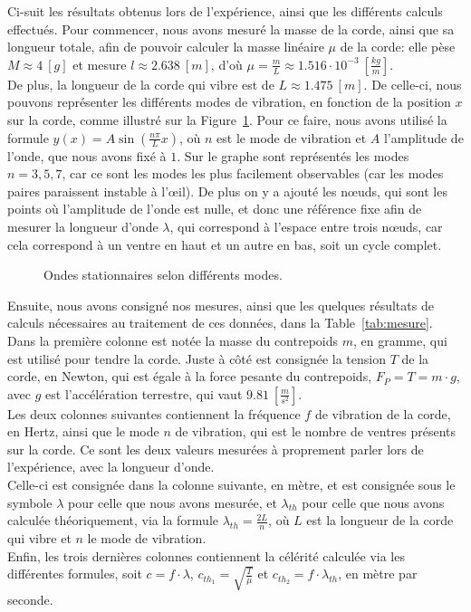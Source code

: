 \documentclass[11pt]{article}
\begin{document}
    Ci-suit les résultats obtenus lors de l'expérience, ainsi que les différents calculs effectués.
    Pour commencer, nous avons mesuré la masse de la corde, ainsi que sa longueur totale, afin de pouvoir calculer
    la masse linéaire $\mu$ de la corde: elle pèse $M \approx 4 \ [g]$ et mesure $l \approx 2.638 \ [m]$, d'où
    $\mu = \frac{m}{L} \approx 1.516 \cdot 10^{-3} \ \left[\frac{kg}{m}\right]$.\\
    De plus, la longueur de la corde qui vibre est de $L \approx 1.475 \ [m]$.
    De celle-ci, nous pouvons représenter les différents modes de vibration, en fonction de la position $x$ sur la
    corde, comme illustré sur la Figure~\ref{fig:waves}.
    Pour ce faire, nous avons utilisé la formule $y(x) = A \sin \left( \frac{n \pi}{L} x \right)$, où $n$ est le mode
    de vibration et $A$ l'amplitude de l'onde, que nous avons fixé à $1$.
    Sur le graphe sont représentés les modes $n=3,5,7$, car ce sont les modes les plus facilement observables (car
    les modes paires paraissent instable à l'œil).
    De plus on y a ajouté les nœuds, qui sont les points où l'amplitude de l'onde est nulle, et donc une référence
    fixe afin de mesurer la longueur d'onde $\lambda$, qui correspond à l'espace entre trois nœuds, car cela
    correspond à un ventre en haut et un autre en bas, soit un cycle complet.

    \begin{figure}[H]
        \centering
        \resizebox{1.0\textwidth}{!}{}
        \caption{Ondes stationnaires selon différents modes.}
        \label{fig:waves}
    \end{figure}

    Ensuite, nous avons consigné nos mesures, ainsi que les quelques résultats de calculs nécessaires au traitement
    de ces données, dans la Table~\ref{tab:mesure}.\\
    Dans la première colonne est notée la masse du contrepoids $m$, en gramme, qui est utilisé pour tendre la corde.
    Juste à côté est consignée la tension $T$ de la corde, en Newton, qui est égale à la force pesante du contrepoids,
    $F_P = T = m \cdot g$, avec $g$ est l'accélération terrestre, qui vaut $9.81 \ \left[\frac{m}{s^2}\right]$.\\
    Les deux colonnes suivantes contiennent la fréquence $f$ de vibration de la corde, en Hertz, ainsi que le mode
    $n$ de vibration, qui est le nombre de ventres présents sur la corde.
    Ce sont les deux valeurs mesurées à proprement parler lors de l'expérience, avec la longueur d'onde.\\
    Celle-ci est consignée dans la colonne suivante, en mètre, et est consignée sous le symbole $\lambda$ pour celle
    que nous avons mesurée, et $\lambda_{th}$ pour celle que nous avons calculée théoriquement, via la formule
    $\lambda_{th} = \frac{2L}{n}$, où $L$ est la longueur de la corde qui vibre et $n$ le mode de vibration.\\
    Enfin, les trois dernières colonnes contiennent la célérité calculée via les différentes formules, soit
    $c = f \cdot \lambda$, $c_{th_1} = \sqrt{\frac{T}{\mu}}$ et $c_{th_2} = f \cdot \lambda_{th}$, en mètre par
    seconde.
\end{document}
